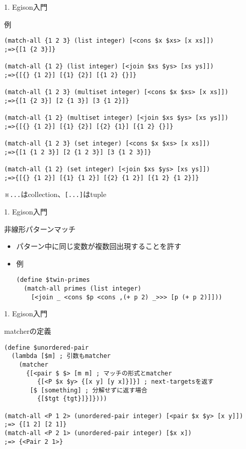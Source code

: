 \documentclass[dvipdfmx,11pt,notheorems]{beamer}
\theoremstyle{definition}
\newcommand{\code}[1]{\texttt{#1}}
\begin{document}
\begin{frame}[fragile]{1. Egison入門}
  \begin{exampleblock}{例}
    \begin{verbatim}
(match-all {1 2 3} (list integer) [<cons $x $xs> [x xs]])
;=>{[1 {2 3}]}

(match-all {1 2} (list integer) [<join $xs $ys> [xs ys]])
;=>{[{} {1 2}] [{1} {2}] [{1 2} {}]}

(match-all {1 2 3} (multiset integer) [<cons $x $xs> [x xs]])
;=>{[1 {2 3}] [2 {1 3}] [3 {1 2}]}

(match-all {1 2} (multiset integer) [<join $xs $ys> [xs ys]])
;=>{[{} {1 2}] [{1} {2}] [{2} {1}] [{1 2} {}]}

(match-all {1 2 3} (set integer) [<cons $x $xs> [x xs]])
;=>{[1 {1 2 3}] [2 {1 2 3}] [3 {1 2 3}]}

(match-all {1 2} (set integer) [<join $xs $ys> [xs ys]])
;=>{[{} {1 2}] [{1} {1 2}] [{2} {1 2}] [{1 2} {1 2}]}
    \end{verbatim}
※\code{{...}}はcollection、\code{[...]}はtuple
  \end{exampleblock}
\end{frame}

\begin{frame}[fragile]{1. Egison入門}
  \begin{block}{非線形パターンマッチ}
    \begin{itemize}
      \item パターン中に同じ変数が複数回出現することを許す
      \item 例
      \begin{verbatim}
(define $twin-primes
  (match-all primes (list integer)
    [<join _ <cons $p <cons ,(+ p 2) _>>> [p (+ p 2)]]))
      \end{verbatim}
    \end{itemize}
  \end{block}
\end{frame}

\begin{frame}[fragile]{1. Egison入門}
  \begin{block}{matcherの定義}
    \begin{verbatim}
(define $unordered-pair
  (lambda [$m] ; 引数もmatcher
    (matcher
      {[<pair $ $> [m m] ; マッチの形式とmatcher
         {[<P $x $y> {[x y] [y x]}]}] ; next-targetsを返す
       [$ [something] ; 分解せずに返す場合
         {[$tgt {tgt}]}]})))

(match-all <P 1 2> (unordered-pair integer) [<pair $x $y> [x y]])
;=> {[1 2] [2 1]}
(match-all <P 2 1> (unordered-pair integer) [$x x])
;=> {<Pair 2 1>}
    \end{verbatim}
  \end{block}
\end{frame}
\end{document}
